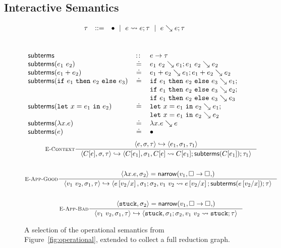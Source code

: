 \subsection{Interactive Semantics}
\label{sec:inter-semant}
%
\begin{figure}[t]
$$
\begin{array}{rrcl}
  & \tau & ::= & \bullet \ \mid \  e \leadsto e; \tau \ \mid \  e \searrow e; \tau
\end{array}
$$
\\
\relDescription{\subtermssym}
\begin{gather*}
\begin{array}{lcl}
\mathsf{subterms}                 & \colon\!\!\colon & e \to \tau \\
\mathsf{subterms}(e_1 \ e_2)   & \doteq & e_1 \ e_2 \searrow e_1; e_1 \ e_2 \searrow e_2 \\
\mathsf{subterms}(e_1 + e_2)   & \doteq & e_1 + e_2 \searrow e_1; e_1 + e_2 \searrow e_2 \\
\mathsf{subterms}(\mathtt{if}\ e_1\ \mathtt{then}\ e_2\ \mathtt{else}\ e_3)   & \doteq & \mathtt{if}\ e_1\ \mathtt{then}\ e_2\ \mathtt{else}\ e_3 \searrow e_1; \\
                                &        & \mathtt{if}\ e_1\ \mathtt{then}\ e_2\ \mathtt{else}\ e_3 \searrow e_2; \\
                                &        & \mathtt{if}\ e_1\ \mathtt{then}\ e_2\ \mathtt{else}\ e_3 \searrow e_3 \\
\mathsf{subterms}(\mathtt{let}\ x = e_1\ \mathtt{in}\ e_2)   & \doteq & \mathtt{let}\ x = e_1\ \mathtt{in}\ e_2 \searrow e_1; \\
                                &        & \mathtt{let}\ x = e_1\ \mathtt{in}\ e_2 \searrow e_2 \\
\mathsf{subterms}(\lambda x. e)       & \doteq & \lambda x. e \searrow e \\
\mathsf{subterms}(e)                 & \doteq & \bullet
\end{array}
\end{gather*}
\begin{gather*}
\inference[\recontext]
  {\stepg{e}{\su}{\tr}{e_1}{\su_1}{\tr_1}}
  {\stepg{C[e]}{\su}{\tr}{C[e_1]}{\su_1}{\singlestep{C[e]}{C[e_1]}; \subterms{C[e_1]}; \tr_1}}
\\ \\
\inference[\reappgood]
  {\pair{\efun{x}{e}}{\su_2} = \force{v_1}{\tfun{\thole{}}{\thole{}}}}
  {\stepg{\eapp{v_1}{v_2}}{\su_1}{\tr}
         {e\sub{x}{v_2}}{\su_1;\su_2}{\singlestep{\eapp{v_1}{v_2}}{e\sub{x}{v_2}}; \subterms{e\sub{x}{v_2}}; \tr}}
\\ \\
\inference[\reappbad]
  {\pair{\stuck}{\su_2} = \force{v_1}{\tfun{\thole{}}{\thole{}}}}
  {\stepg{\eapp{v_1}{v_2}}{\su_1}{\tr}{\stuck}{\su_1;\su_2}{\singlestep{\eapp{v_1}{v_2}}{\stuck}; \tr}}
\end{gather*}
\caption{A selection of the operational semantics from
  Figure~\ref{fig:operational}, extended to collect a full reduction
  graph.}
\label{fig:interactive}
\end{figure}
